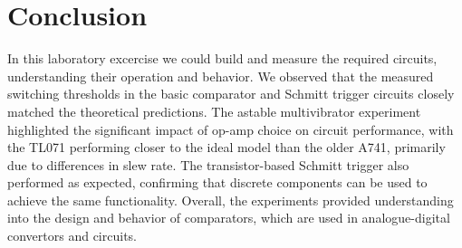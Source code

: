 \documentclass[12pt,a4paper]{article}
\begin{document}
\section{Conclusion}

In this laboratory excercise we could build and measure the required circuits, understanding their operation and behavior. We observed that the measured switching thresholds in the basic comparator and Schmitt trigger circuits closely matched the theoretical predictions. The astable multivibrator experiment highlighted the significant impact of op-amp choice on circuit performance, with the TL071 performing closer to the ideal model than the older \textmu A741, primarily due to differences in slew rate. The transistor-based Schmitt trigger also performed as expected, confirming that discrete components can be used to achieve the same functionality. Overall, the experiments provided understanding into the design and behavior of comparators, which are used in analogue-digital convertors and circuits.
\end{document}
